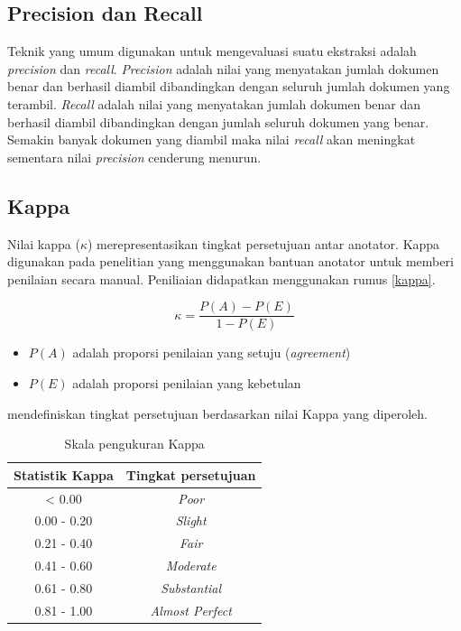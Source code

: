 \subsection{Precision dan Recall}
Teknik yang umum digunakan untuk mengevaluasi suatu ekstraksi adalah \textit{precision} dan \textit{recall}. \textit{Precision} adalah nilai yang menyatakan jumlah dokumen benar dan berhasil diambil dibandingkan dengan seluruh jumlah dokumen yang terambil. \textit{Recall} adalah nilai yang menyatakan jumlah dokumen benar dan berhasil diambil dibandingkan dengan jumlah seluruh dokumen yang benar. Semakin banyak dokumen yang diambil maka nilai \textit{recall} akan meningkat sementara nilai \textit{precision} cenderung menurun. 

\subsection{Kappa}
Nilai kappa ($\kappa$) merepresentasikan tingkat persetujuan antar anotator. Kappa digunakan pada penelitian yang menggunakan bantuan anotator untuk memberi penilaian secara manual. Peniliaian didapatkan menggunakan rumus \ref{kappa}.

\begin{equation}
\label{kappa}
\kappa=\frac{P(A)-P(E)}{1-P(E)}
\end{equation}

\begin{itemize}
  \item $P(A)$ adalah proporsi penilaian yang setuju (\textit{agreement})
  \item $P(E)$ adalah proporsi penilaian yang kebetulan
\end{itemize}

\noindent \cite{landis1977measurement} mendefiniskan tingkat persetujuan berdasarkan nilai Kappa yang diperoleh. 
\begin{table}
  \centering
    \caption{Skala pengukuran Kappa}
    \label{table:skalaKappa}
    \begin{tabular}{|c|c|}
      \hline
      Statistik Kappa & Tingkat persetujuan \\ \hline
      < 0.00 & \textit{Poor} \\ \hline
      0.00 - 0.20 & \textit{Slight} \\ \hline
      0.21 - 0.40 & \textit{Fair} \\ \hline
      0.41 - 0.60 & \textit{Moderate} \\ \hline
      0.61 - 0.80 & \textit{Substantial} \\ \hline
      0.81 - 1.00 & \textit{Almost Perfect} \\ \hline
    \end{tabular}
\end{table}

